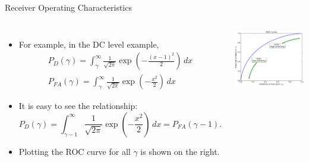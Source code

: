 \documentclass[10pt, aspectratio=169]{beamer} %
\begin{document}
\begin{frame}[fragile,allowframebreaks=0.8]
 {Receiver Operating Characteristics}
\begin{columns}
\begin{itemize}
\item For example, in the DC level example, 
\begin{align*}
P_D(\gamma) = \int_{\gamma}^{\infty} \frac{1}{\sqrt{2\pi}}\exp\left(-\frac{(x-1)^2}{2}\right)\,dx\\
P_{FA}(\gamma) = \int_{\gamma}^{\infty} \frac{1}{\sqrt{2\pi}}\exp\left(-\frac{x^2}{2}\right)\,dx
\end{align*}
\item It is easy to see the relationship:
\[
P_D(\gamma) = \int_{\gamma-1}^{\infty} \frac{1}{\sqrt{2\pi}}\exp\left(-\frac{x^2}{2}\right)\,dx = P_{FA}(\gamma-1).
\]
\item Plotting the ROC curve for all $\gamma$ is shown on the right.
\end{itemize}

\centerline{\includegraphics[width=\textwidth]{RocCurve.pdf}}

\end{columns}

\end{frame}
\end{document}
